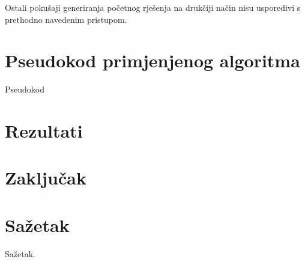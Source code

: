 \documentclass[times, utf8, seminar, numeric]{fer}
\begin{document}
Ostali pokušaji generiranja početnog rješenja na drukčiji način nisu usporedivi s prethodno navedenim pristupom.

\chapter{Pseudokod primjenjenog algoritma}
Pseudokod

\chapter{Rezultati}

\chapter{Zaključak}

%
%

\chapter{Sažetak}
Sažetak.
\end{document}
